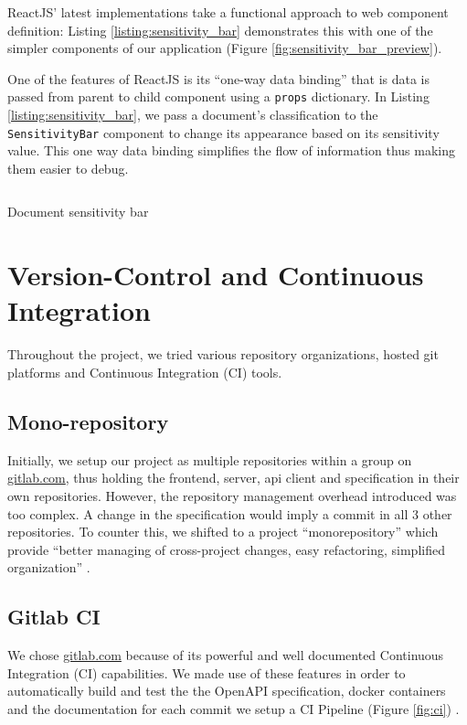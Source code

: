 \documentclass{l4proj}
\begin{document}
ReactJS' latest implementations take a functional approach to web component definition: Listing \ref{listing:sensitivity_bar} demonstrates this with one of the simpler components of our application (Figure \ref{fig:sensitivity_bar_preview}).

One of the features of ReactJS is its ``one-way data binding'' that is data is passed from parent to child component using a \verb|props| dictionary.
In Listing \ref{listing:sensitivity_bar}, we pass a document's classification to the \verb|SensitivityBar| component to change its appearance based on its sensitivity value.
This one way data binding simplifies the flow of information thus making them easier to debug.


\begin{listing}[H]
    \inputminted{jsx}{code/documentSensitivityBar.js}
    \caption{Document sensitivity bar}
    \label{listing:sensitivity_bar}
\end{listing}

\section{Version-Control and Continuous Integration}

Throughout the project, we tried various repository organizations, hosted git platforms and Continuous Integration (CI) tools.


\subsection{Mono-repository}

Initially, we setup our project as multiple repositories within a group on \href{https://gitlab.com/harpocrates-app}{gitlab.com}, thus holding the frontend, server, api client and specification in their own repositories.
However, the repository management overhead introduced was too complex. A change in the specification would imply a commit in all 3 other repositories.
To counter this, we shifted to a project ``monorepository'' which provide ``better managing of cross-project changes, easy refactoring, simplified organization'' \autocite[1]{britoMonoreposMultivocalLiterature2018}.

\subsection{Gitlab CI}

We chose \href{https://gitlab.com/}{gitlab.com} because of its powerful and well documented Continuous Integration (CI) capabilities.
We made use of these features in order to automatically build and test the the OpenAPI specification, docker containers and the documentation for each commit we setup a CI Pipeline (Figure \ref{fig:ci}) .
\end{document}
